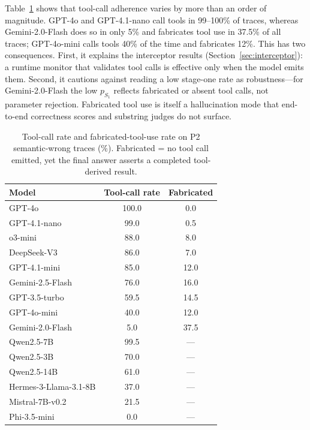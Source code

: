 \documentclass{ieeeaccess}
\begin{document}
Table~\ref{tab:toolcall} shows that tool-call adherence varies by more than an
order of magnitude. GPT-4o and GPT-4.1-nano call tools in 99--100\% of traces,
whereas Gemini-2.0-Flash does so in only 5\% and fabricates tool use in 37.5\%
of all traces; GPT-4o-mini calls tools 40\% of the time and fabricates 12\%.
This has two consequences. First, it explains the interceptor results
(Section~\ref{sec:interceptor}): a runtime monitor that validates tool calls is
effective only when the model emits them. Second, it cautions against reading a
low stage-one rate as robustness---for Gemini-2.0-Flash the low $p_{S_1}$
reflects fabricated or absent tool calls, not parameter rejection. Fabricated
tool use is itself a hallucination mode that end-to-end correctness scores and
substring judges do not surface.

\begin{table}[t]
\caption{Tool-call rate and fabricated-tool-use rate on P2 semantic-wrong
traces (\%). Fabricated = no tool call emitted, yet the final answer asserts a
completed tool-derived result.}
\label{tab:toolcall}
\centering\small
\begin{tabular}{lcc}
\toprule
Model & Tool-call rate & Fabricated \\
\midrule
GPT-4o & 100.0 & 0.0 \\
GPT-4.1-nano & 99.0 & 0.5 \\
o3-mini & 88.0 & 8.0 \\
DeepSeek-V3 & 86.0 & 7.0 \\
GPT-4.1-mini & 85.0 & 12.0 \\
Gemini-2.5-Flash & 76.0 & 16.0 \\
GPT-3.5-turbo & 59.5 & 14.5 \\
GPT-4o-mini & 40.0 & 12.0 \\
Gemini-2.0-Flash & 5.0 & 37.5 \\
\midrule
Qwen2.5-7B & 99.5 & --- \\
Qwen2.5-3B & 70.0 & --- \\
Qwen2.5-14B & 61.0 & --- \\
Hermes-3-Llama-3.1-8B & 37.0 & --- \\
Mistral-7B-v0.2 & 21.5 & --- \\
Phi-3.5-mini & 0.0 & --- \\
\bottomrule
\end{tabular}
\end{table}
\end{document}
